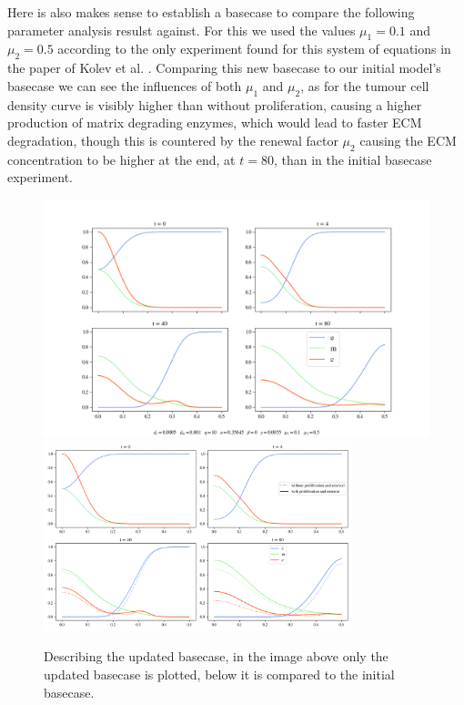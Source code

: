 Here is also makes sense to establish a basecase to compare the following parameter analysis resulst against. For this we used the values $\mu_1= 0.1$ and $\mu_2=0.5$ according to the only experiment found for this system of equations in the paper of Kolev et al. \cite{Kolev2010}.\newline
Comparing this new basecase to our initial model's basecase we can see the influences of both $\mu_1$ and $\mu_2$, as for the tumour cell density curve is visibly higher than without proliferation, causing a higher production of matrix degrading enzymes, which would lead to faster ECM degradation, though this is countered by the renewal factor $\mu_2$ causing the ECM concentration to be higher at the end, at $t=80$, than in the initial basecase experiment.

\begin{figure}[h]
    \centering
    \includegraphics[width=\textwidth]{resources/images/basecase_proliferation.png}
    \includegraphics[width=0.8\textwidth]{resources/images/basecase_comparison.png}
    \label{fig:prolif_basecase}
    \caption{Describing the updated basecase, in the image above only the updated basecase is plotted, below it is compared to the initial basecase.}
\end{figure}





